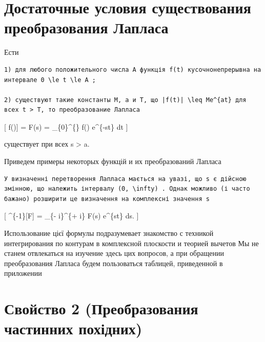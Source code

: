 \documentclass[
  ukrainian,
]{article}
\begin{document}
\section{Достаточные условия существования преобразования
Лапласа}\label{ux434ux43eux441ux442ux430ux442ux43eux447ux43dux44bux435-ux443ux441ux43bux43eux432ux438ux44f-ux441ux443ux449ux435ux441ux442ux432ux43eux432ux430ux43dux438ux44f-ux43fux440ux435ux43eux431ux440ux430ux437ux43eux432ux430ux43dux438ux44f-ux43bux430ux43fux43bux430ux441ux430}

Ести

\begin{verbatim}
1) для любого положительного числа A функція f(t) кусочнонепрерывна на интервале 0 \le t \le A ;

2) существуют такие константы M, a и T, що |f(t)| \leq Me^{at} для всех t > T, то преобразование Лапласа
\end{verbatim}

{[} \mathscr{L}{[}f(\ell){]} = F(s) = \int\_\{0\}\^{}\{\infty\} f(\ell)
e\^{}\{-st\} dt {]}

существует при всех s \textgreater{} a.

Приведем примеры некоторых функцій и их преобразований Лапласа

\begin{verbatim}
У визначенні перетворення Лапласа мається на увазі, що s є дійсною змінною, що належить інтервалу (0, \infty) . Однак можливо (і часто бажано) розширити це визначення на комплексні значення s
\end{verbatim}

{[} \^{}\{-1\}{[}F{]} =  \int\_\{\epsilon -
i\infty\}\^{}\{\epsilon + i\infty\} F(s) e\^{}\{st\} ds. {]}

Использование цієї формулы подразумевает знакомство с техникой
интегрирования по контурам в комплексной плоскости и теорией вычетов Мы
не станем отвлекаться на изучение здесь цих вопросов, а при обращении
преобразования Лапласа будем пользоваться таблицей, приведенной в
приложении

\section{Свойство 2 (Преобразования частинних
похідних)}\label{ux441ux432ux43eux439ux441ux442ux432ux43e-2-ux43fux440ux435ux43eux431ux440ux430ux437ux43eux432ux430ux43dux438ux44f-ux447ux430ux441ux442ux438ux43dux43dux438ux445-ux43fux43eux445ux456ux434ux43dux438ux445}
\end{document}
